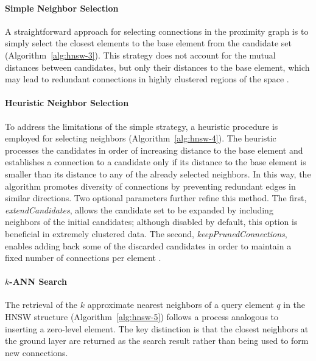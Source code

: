 \paragraph{Simple Neighbor Selection}

A straightforward approach for selecting connections in the proximity graph is to simply select the closest elements to the base element from the candidate set (Algorithm~\ref{alg:hnsw-3}). This strategy does not account for the mutual distances between candidates, but only their distances to the base element, which may lead to redundant connections in highly clustered regions of the space \cite{Malkov-Yashunin-2016}.



\paragraph{Heuristic Neighbor Selection}

To address the limitations of the simple strategy, a heuristic procedure is employed for selecting neighbors (Algorithm~\ref{alg:hnsw-4}). The heuristic processes the candidates in order of increasing distance to the base element and establishes a connection to a candidate only if its distance to the base element is smaller than its distance to any of the already selected neighbors. In this way, the algorithm promotes diversity of connections by preventing redundant edges in similar directions.
\newpage
Two optional parameters further refine this method. The first, \textit{extendCandidates}, allows the candidate set to be expanded by including neighbors of the initial candidates; although disabled by default, this option is beneficial in extremely clustered data. The second, \textit{keepPrunedConnections}, enables adding back some of the discarded candidates in order to maintain a fixed number of connections per element \cite{Malkov-Yashunin-2016}.



\paragraph{$k$-ANN Search}

The retrieval of the $k$ approximate nearest neighbors of a query element $q$ in the HNSW structure (Algorithm~\ref{alg:hnsw-5}) follows a process analogous to inserting a zero-level element. The key distinction is that the closest neighbors at the ground layer are returned as the search result rather than being used to form new connections.

